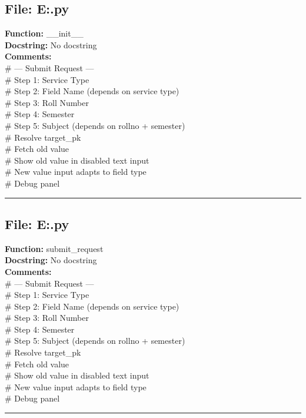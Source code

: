 {\subsection*{File: E:\project\capstone\frontend\faculty\request.py}
\textbf{Function:} __init__\\
\textbf{Docstring:} No docstring\\
\textbf{Comments:}\\
# --- Submit Request ---\\
# Step 1: Service Type\\
# Step 2: Field Name (depends on service type)\\
# Step 3: Roll Number\\
# Step 4: Semester\\
# Step 5: Subject (depends on rollno + semester)\\
# Resolve target\_pk\\
# Fetch old value\\
# Show old value in disabled text input\\
# New value input adapts to field type\\
# Debug panel\\

\hrule

\subsection*{File: E:\project\capstone\frontend\faculty\request.py}
\textbf{Function:} submit_request\\
\textbf{Docstring:} No docstring\\
\textbf{Comments:}\\
# --- Submit Request ---\\
# Step 1: Service Type\\
# Step 2: Field Name (depends on service type)\\
# Step 3: Roll Number\\
# Step 4: Semester\\
# Step 5: Subject (depends on rollno + semester)\\
# Resolve target\_pk\\
# Fetch old value\\
# Show old value in disabled text input\\
# New value input adapts to field type\\
# Debug panel\\

\hrule

}
